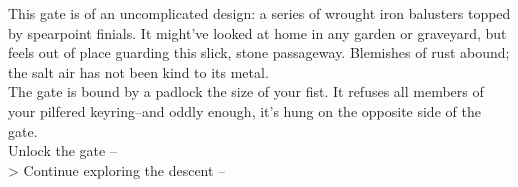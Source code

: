 This gate is of an uncomplicated design: a series of wrought iron balusters topped by spearpoint finials. It might've looked at home in any garden or graveyard, but feels out of place guarding this slick, stone passageway. Blemishes of rust abound; the salt air has not been kind to its metal.\\

The gate is bound by a padlock the size of your fist. It refuses all members of your pilfered keyring--and oddly enough, it’s hung on the opposite side of the gate.\\

 Unlock the gate -- \\
> Continue exploring the descent -- 